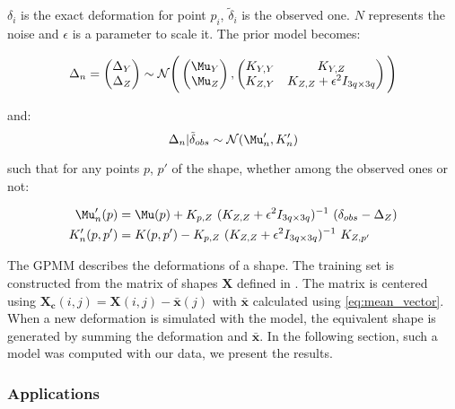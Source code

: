 $\delta_i$ is the exact deformation for point $p_i$, $\tilde{\delta}_i$ is the observed one. $N$ represents the noise and $\epsilon$ is a parameter to scale it. The prior model becomes: 

\begin{equation}
	\Delta_n = 
	\begin{pmatrix} \Delta_Y \\ \Delta_Z \end{pmatrix}
	\sim\mathcal N \Bigg(
	\begin{pmatrix} \Mu_Y \\ \Mu_Z \end{pmatrix}, 
	\begin{pmatrix} 
	K_{Y,Y} & K_{Y,Z} \\ 
	K_{Z,Y} & K_{Z,Z} + \epsilon^2 I_{3q\times3q} 
	\end{pmatrix} 
	\Bigg)
\end{equation}

and:
\begin{equation}
	\Delta_n | \tilde{\delta}_{obs} \sim \mathcal N( \Mu'_n, K'_n)
\end{equation}

such that for any points $p$, $p'$ of the shape, whether among the observed ones or not: 

\begin{equation} 
	\label{eq:noisy_posterior}
	\begin{split}
		\Mu'_n(p) &= \Mu(p) + K_{p,Z} \ (K_{Z,Z} + \epsilon^2 I_{3q\times3q})^{-1} \ (\delta_{obs} - \Delta_Z) \\
		K'_n(p, p') &= K(p, p') - K_{p,Z} \ (K_{Z,Z} + \epsilon^2 I_{3q\times3q})^{-1} \ K_{Z,p'}
	\end{split}
\end{equation}

The GPMM describes the deformations of a shape. The training set is constructed from the matrix of shapes $\mathbf{X}$ defined in . The matrix is centered using 
$\mathbf{X_c}(i,j) = \mathbf{X}(i,j) - \bar{\mathbf{x}}(j)$
with $\bar{\mathbf{x}}$ calculated using \eqref{eq:mean_vector}. When a new deformation is simulated with the model, the equivalent shape is generated by summing the deformation and $\bar{\mathbf{x}}$. In the following section, such a model was computed with our data, we present the results. 

\subsubsection{Applications}
\label{ssubsec:5_GP_nowork}

